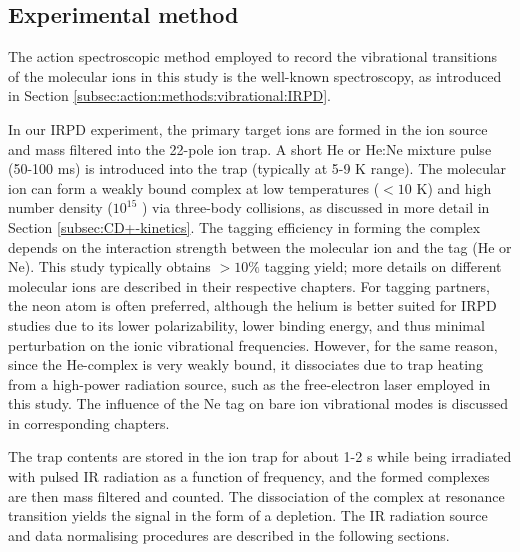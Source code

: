 \subsection{Experimental method}
\label{subsec:IRPD}

The action spectroscopic method employed to record the vibrational transitions of the molecular ions in this study is the well-known  spectroscopy, as introduced in Section \ref{subsec:action:methods:vibrational:IRPD}.

In our IRPD experiment, the primary target ions are formed in the ion source and mass filtered into the 22-pole ion trap. A short He or He:Ne mixture pulse (50-100 ms) is introduced into the trap (typically at 5-9 K range). The molecular ion can form a weakly bound complex at low temperatures ($< 10$ K) and high number density ($10^{15}$ \percc ) via three-body collisions, as discussed in more detail in Section \ref{subsec:CD+-kinetics}. The tagging efficiency in forming the complex depends on the interaction strength between the molecular ion and the tag (He or Ne). This study typically obtains $> 10 \%$ tagging yield; more details on different molecular ions are described in their respective chapters. For tagging partners, the neon atom is often preferred, although the helium is better suited for IRPD studies due to its lower polarizability, lower binding energy, and thus  minimal perturbation on the ionic vibrational frequencies. However, for the same reason, since the He-complex is very weakly bound, it dissociates due to trap heating from a high-power radiation source, such as the free-electron laser employed in this study. The influence of the Ne tag on bare ion vibrational modes is discussed in corresponding chapters.

The trap contents are stored in the ion trap for about 1-2 s while being irradiated with pulsed IR radiation as a function of frequency, and the formed complexes are then mass filtered and counted. The dissociation of the complex at resonance transition yields the signal in the form of a depletion. The IR radiation source and data normalising procedures are described in the following sections.
